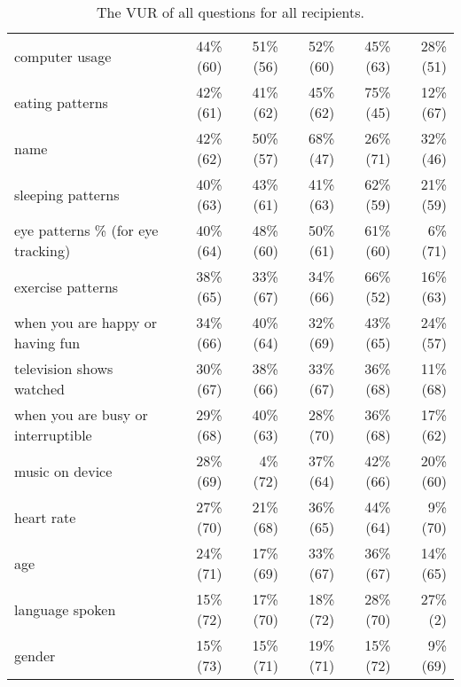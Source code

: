 \begin{table*}[t]
\begin{center}
\begin{tabular}{| l | r | r | r | r | r |}
computer usage& 44\% (60) & 51\% (56) & 52\% (60) & 45\% (63) & 28\% (51) \\ 
eating patterns & 42\% (61) & 41\% (62) & 45\% (62) & 75\% (45) & 12\% (67) \\ 
name & 42\% (62) & 50\% (57) & 68\% (47) & 26\% (71) & 32\% (46) \\ 
sleeping patterns & 40\% (63) & 43\% (61) & 41\% (63) & 62\% (59) & 21\% (59) \\ 
eye patterns \% (for eye tracking) & 40\% (64) & 48\% (60) & 50\% (61) & 61\% (60) & 6\% (71) \\ 
exercise patterns & 38\% (65) & 33\% (67) & 34\% (66) & 66\% (52) & 16\% (63) \\ 
when you are happy or having fun & 34\% (66) & 40\% (64) & 32\% (69) & 43\% (65) & 24\% (57) \\ 
television shows watched & 30\% (67) & 38\% (66) & 33\% (67) & 36\% (68) & 11\% (68) \\ 
when you are busy or interruptible & 29\% (68) & 40\% (63) & 28\% (70) & 36\% (68) & 17\% (62) \\ 
music on device & 28\% (69) & 4\% (72) & 37\% (64) & 42\% (66) & 20\% (60) \\ 
heart rate & 27\% (70) & 21\% (68) & 36\% (65) & 44\% (64) & 9\% (70) \\ 
age & 24\% (71) & 17\% (69) & 33\% (67) & 36\% (67) & 14\% (65) \\ 
language spoken & 15\% (72) & 17\% (70) & 18\% (72) & 28\% (70) & 27\% (2) \\ 
gender & 15\% (73) & 15\% (71) & 19\% (71) & 15\% (72) & 9\% (69) \\ 
\hline
\end{tabular}
\caption{The VUR of all questions for all recipients.}
\label{all-vur}
\end{center}
\end{table*}